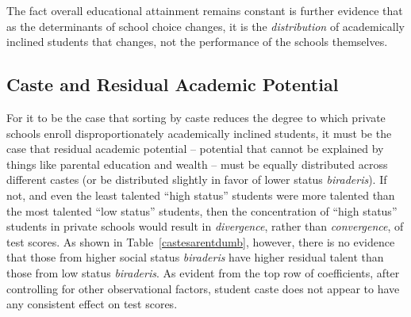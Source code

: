 \documentclass[Eubank_pk_ethnic_sorting.tex]{subfiles}
\begin{document}


The fact overall educational attainment remains constant is further evidence that as the determinants of school choice changes, it is the \emph{distribution} of academically inclined students that changes, not the performance of the schools themselves.

\subsection{Caste and Residual Academic Potential}\label{residual_potential}

For it to be the case that sorting by caste reduces the degree to which private schools enroll disproportionately academically inclined students, it must be the case that residual academic potential -- potential that cannot be explained by things like parental education and wealth -- must be equally distributed across different castes (or be distributed slightly in favor of lower status \emph{biraderis}). If not, and even the least talented ``high status'' students were more talented than the most talented ``low status'' students, then the concentration of ``high status'' students in private schools would result in \emph{divergence}, rather than \emph{convergence}, of test scores. As shown in Table~\ref{castesarentdumb}, however, there is no evidence that those from higher social status \emph{biraderis} have higher residual talent than those from low status \emph{biraderis}. As evident from the top row of coefficients, after controlling for other observational factors, student caste does not appear to have any consistent effect on test scores.


\end{document}
